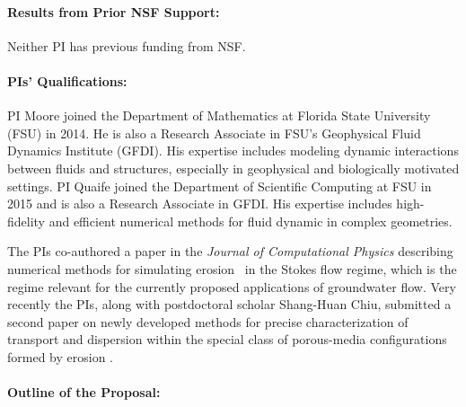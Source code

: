 \documentclass[11pt]{article}
\begin{document}
\paragraph{Results from Prior NSF Support:} Neither PI has previous funding from NSF.

\paragraph{PIs' Qualifications:} PI Moore joined the Department of Mathematics at Florida State University (FSU) in 2014. He is also a Research Associate in FSU's Geophysical Fluid Dynamics Institute (GFDI).  His expertise includes modeling dynamic interactions between fluids and structures, especially in geophysical and biologically motivated settings. PI Quaife joined the Department of Scientific Computing at FSU in 2015 and is also a Research Associate in GFDI. His expertise includes high-fidelity and efficient numerical methods for fluid dynamic in complex geometries.

The PIs co-authored a paper in the {\em Journal of Computational Physics} describing numerical methods for simulating erosion~\cite{Quaife2018} in the Stokes flow regime, which is the regime relevant for the currently proposed applications of groundwater flow. Very recently the PIs, along with postdoctoral scholar Shang-Huan Chiu, submitted a second paper on newly developed methods for precise characterization of transport and dispersion within the special class of porous-media configurations formed by erosion \cite{chi-moo-qua2019}.


\paragraph{Outline of the Proposal:} 




\end{document}
